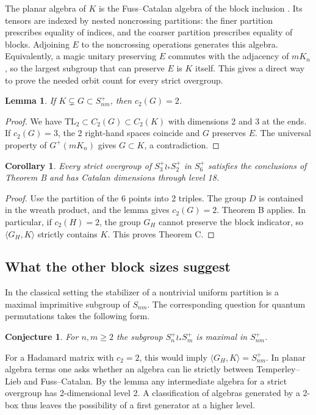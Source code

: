 \documentclass[11pt,a4paper]{amsart}
\newtheorem{corollary}[theorem]{Corollary}
\newtheorem{lemma}[theorem]{Lemma}
\newtheorem{conjecture}[theorem]{Conjecture}
\newcommand{\TL}{\mathrm{TL}}
\begin{document}
The planar algebra of $K$ is the Fuss--Catalan algebra of the block inclusion \cite{bjo}. Its tensors are indexed by nested noncrossing partitions: the finer partition prescribes equality of indices, and the coarser partition prescribes equality of blocks. Adjoining $E$ to the noncrossing operations generates this algebra. Equivalently, a magic unitary preserving $E$ commutes with the adjacency of $mK_n$, so the largest subgroup that can preserve $E$ is $K$ itself. This gives a direct way to prove the needed orbit count for every strict overgroup.

\begin{lemma}\label{lem:wreath}
If $K\subsetneq G\subset S_{nm}^+$, then $c_2(G)=2$.
\end{lemma}
\begin{proof}
We have $\TL_2\subset C_2(G)\subset C_2(K)$ with dimensions 2 and 3 at the ends. If $c_2(G)=3$, the 2 right-hand spaces coincide and $G$ preserves $E$. The universal property of $G^+(mK_n)$ gives $G\subset K$, a contradiction.
\end{proof}
\begin{corollary}\label{thm:wreath}
Every strict overgroup of $S_3^+\wr_*S_2^+$ in $S_6^+$ satisfies the conclusions of Theorem B and has Catalan dimensions through level 18.
\end{corollary}
\begin{proof}
Use the partition of the 6 points into 2 triples. The group $D$ is contained in the wreath product, and the lemma gives $c_2(G)=2$. Theorem B applies. In particular, if $c_2(H)=2$, the group $G_H$ cannot preserve the block indicator, so $\langle G_H,K\rangle$ strictly contains $K$. This proves Theorem C.
\end{proof}

\subsection{What the other block sizes suggest}
In the classical setting the stabilizer of a nontrivial uniform partition is a maximal imprimitive subgroup of $S_{nm}$. The corresponding question for quantum permutations takes the following form.
\begin{conjecture}\label{conj:fcmax}
For $n,m\geq2$ the subgroup $S_n^+\wr_*S_m^+$ is maximal in $S_{nm}^+$.
\end{conjecture}
For a Hadamard matrix with $c_2=2$, this would imply $\langle G_H,K\rangle=S_{nm}^+$. In planar algebra terms one asks whether an algebra can lie strictly between Temperley--Lieb and Fuss--Catalan. By the lemma any intermediate algebra for a strict overgroup has 2-dimensional level 2. A classification of algebras generated by a 2-box \cite{bjo,bjl} thus leaves the possibility of a first generator at a higher level.
\end{document}
